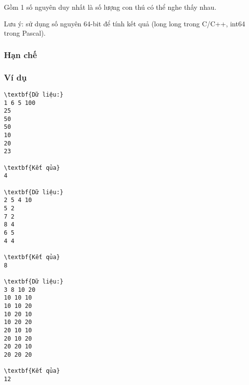    Gồm 1 số nguyên duy nhất là số lượng con thú có thể nghe thấy nhau.  

   Lưu ý: sử dụng số nguyên 64-bit để tính kết quả (long long trong C/C++, int64 trong Pascal).  

\subsubsection{   Hạn chế  }



\subsubsection{   Ví dụ  }
\begin{verbatim}
\textbf{Dữ liệu:}
1 6 5 100
25
50
50
10
20
23

\textbf{Kết qủa}
4

\textbf{Dữ liệu:}
2 5 4 10
5 2
7 2
8 4
6 5
4 4

\textbf{Kết qủa}
8

\textbf{Dữ liệu:}
3 8 10 20
10 10 10
10 10 20
10 20 10
10 20 20
20 10 10
20 10 20
20 20 10
20 20 20

\textbf{Kết qủa}
12
\end{verbatim}

